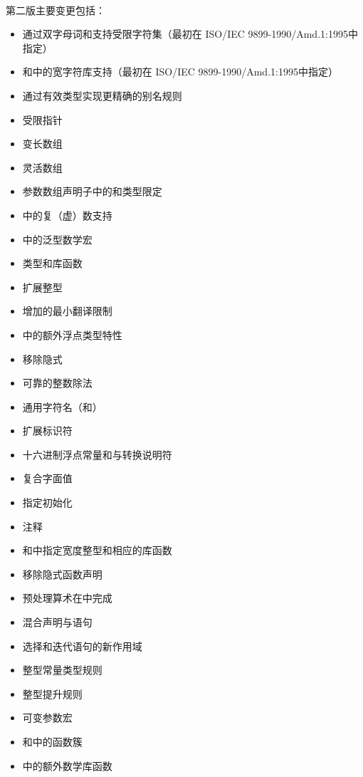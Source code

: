 \paragraph{}
第二版主要变更包括：
\begin{itemize}
  \item{通过双字母词和支持受限字符集（最初在
    ISO/IEC 9899-1990/Amd.1:1995中指定）}
  \item{和中的宽字符库支持（最初在
    ISO/IEC 9899-1990/Amd.1:1995中指定）}
  \item{通过有效类型实现更精确的别名规则}
  \item{受限指针}
  \item{变长数组}
  \item{灵活数组}
  \item{参数数组声明子中的和类型限定}
  \item{中的复（虚）数支持}
  \item{中的泛型数学宏}
  \item{类型和库函数}
  \item{扩展整型}
  \item{增加的最小翻译限制}
  \item{中的额外浮点类型特性}
  \item{移除隐式}
  \item{可靠的整数除法}
  \item{通用字符名（和）}
  \item{扩展标识符}
  \item{十六进制浮点常量和与转换说明符}
  \item{复合字面值}
  \item{指定初始化}
  \item{\tm{//}注释}
  \item{和中指定宽度整型和相应的库函数}
  \item{移除隐式函数声明}
  \item{预处理算术在中完成}
  \item{混合声明与语句}
  \item{选择和迭代语句的新作用域}
  \item{整型常量类型规则}
  \item{整型提升规则}
  \item{可变参数宏}
  \item{和中的函数簇}
  \item{中的额外数学库函数}

\end{itemize}
